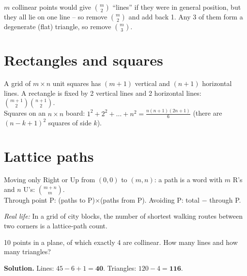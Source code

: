 \documentclass[11pt,a4paper,openany]{report}
\newcommand{\C}[2]{\binom{#1}{#2}}
\begin{document}
\begin{why}
$m$ collinear points would give $\C m2$ ``lines'' if they were in general position, but they all lie on
one line -- so remove $\C m2$ and add back 1. Any 3 of them form a degenerate (flat) triangle, so remove $\C m3$.
\end{why}

\section{Rectangles and squares}
A grid of $m\times n$ unit squares has $(m+1)$ vertical and $(n+1)$ horizontal lines. A rectangle
is fixed by 2 vertical lines and 2 horizontal lines: $\C{m+1}2\C{n+1}2$.\\
Squares on an $n\times n$ board: $1^2+2^2+\dots+n^2=\frac{n(n+1)(2n+1)}6$ (there are $(n-k+1)^2$ squares of side $k$).

\section{Lattice paths}
Moving only Right or Up from $(0,0)$ to $(m,n)$: a path is a word with $m$ R's and $n$ U's:
$\C{m+n}{m}$.\\
Through point P: (paths to P)$\times$(paths from P). Avoiding P: total $-$ through P.

\textit{Real life:} In a grid of city blocks, the number of shortest walking routes
between two corners is a lattice-path count.
\begin{center}
\end{center}

\begin{example}
10 points in a plane, of which exactly 4 are collinear. How many lines and how many triangles?

\textbf{Solution.} Lines: $45-6+1=\mathbf{40}$. Triangles: $120-4=\mathbf{116}$.
\end{example}
\end{document}
